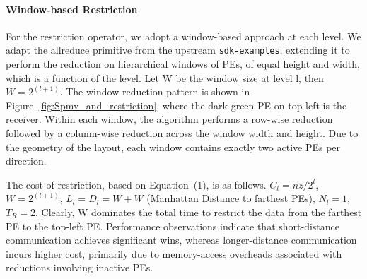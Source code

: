 \documentclass[conference]{IEEEtran}
\begin{document}
            \paragraph{Window-based Restriction}
            For the restriction operator, we adopt a window-based approach at each level.  We adapt the
            allreduce primitive from the upstream \texttt{sdk-examples}, extending it to perform the reduction on hierarchical windows of PEs, of equal height and width, which is a function of the level.
            Let W be the window size at level l, then \(W = 2^{(l+1)}\). The window reduction pattern is shown in Figure~\ref{fig:Spmv_and_restriction}, where the dark green PE on top left is the receiver. Within each window, the algorithm performs a row-wise reduction followed by a column-wise reduction across the window width and height. Due to the geometry of the layout, each window contains exactly two active PEs per direction.

            The cost of restriction, based on Equation~(1), is as follows.
            \(C_l = nz/2^l\), \(W = 2^{(l+1)}\), \(L_l = D_l = W + W\)
            (Manhattan Distance to farthest PEs), \(N_l = 1\), \(T_R = 2\).
            Clearly, W dominates the total time to restrict the data from the farthest PE to the top-left PE. Performance observations indicate that short-distance communication achieves significant wins, whereas longer-distance communication incurs higher cost, primarily due to memory-access overheads associated with reductions involving inactive PEs. %
\end{document}

